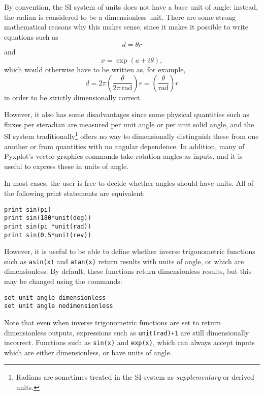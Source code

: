 By convention, the SI system of units does not have a base unit of angle:
instead, the radian is considered to be a dimensionless unit.  There are some
strong mathematical reasons why this makes sense, since it makes it possible to
write equations such as
\begin{displaymath}
d=\theta r
\end{displaymath}
and
\begin{displaymath}
x = \exp(a+i\theta),
\end{displaymath}
which would otherwise have to be written as, for example,
\begin{displaymath}
d=2\pi\left(\frac{\theta}{2\pi\,\mathrm{rad}}\right) r=\left(\frac{\theta}{\mathrm{rad}}\right) r
\end{displaymath}
in order to be strictly dimensionally correct.

However, it also has some disadvantages since some physical quantities such as
fluxes per steradian are measured per unit angle or per unit solid angle, and
the SI system traditionally\footnote{Radians are sometimes treated in the SI
system as {\it supplementary} or derived units.} offers no way to dimensionally
distinguish these from one another or from quantities with no angular
dependence.  In addition, many of Pyxplot's vector graphics commands take
rotation angles as inputs, and it is useful to express these in units of angle.

In most cases, the user is free to decide whether angles should have units. All
of the following print statements are equivalent:

\begin{verbatim}
print sin(pi)
print sin(180*unit(deg))
print sin(pi *unit(rad))
print sin(0.5*unit(rev))
\end{verbatim}

However, it is useful to be able to define whether inverse trigonometric
functions such as {\tt asin(x)} and {\tt atan(x)} return results with units of
angle, or which are dimensionless. By default, these functions return
dimensionless results, but this may be changed using the commands:

\begin{verbatim}
set unit angle dimensionless
set unit angle nodimensionless
\end{verbatim}

\noindent Note that even when inverse trigonometric functions are set to return
dimensionless outputs, expressions such as {\tt unit(rad)+1} are still
dimensionally incorrect. Functions such as {\tt sin(x)} and {\tt exp(x)}, which
can always accept inputs which are either dimensionless, or have units of
angle.

